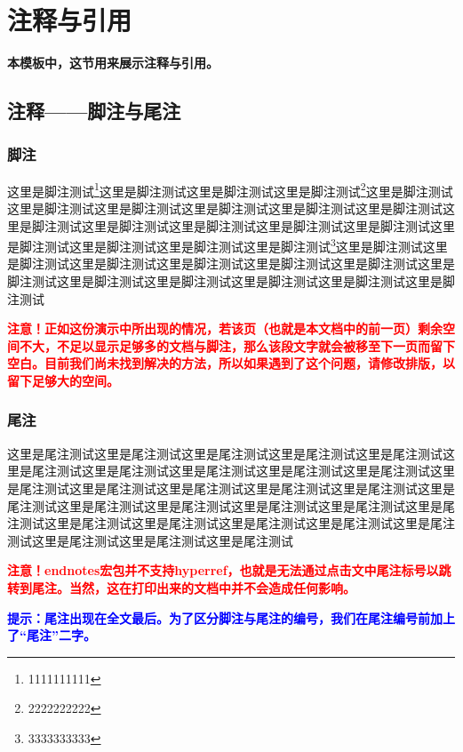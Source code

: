 \section{注释与引用}\textbf{本模板中，这节用来展示注释与引用。}

\subsection{注释——脚注与尾注}
\subsubsection{脚注}
\par 这里是脚注测试\footnote{1111111111}这里是脚注测试这里是脚注测试这里是脚注测试\footnote{2222222222}这里是脚注测试这里是脚注测试这里是脚注测试这里是脚注测试这里是脚注测试这里是脚注测试这里是脚注测试这里是脚注测试这里是脚注测试这里是脚注测试这里是脚注测试这里是脚注测试这里是脚注测试这里是脚注测试这里是脚注测试\footnote{3333333333}这里是脚注测试这里是脚注测试这里是脚注测试这里是脚注测试这里是脚注测试这里是脚注测试这里是脚注测试这里是脚注测试这里是脚注测试这里是脚注测试这里是脚注测试这里是脚注测试

\par \textcolor{red}{\textbf{注意！正如这份演示中所出现的情况，若该页（也就是本文档中的前一页）剩余空间不大，不足以显示足够多的文档与脚注，那么该段文字就会被移至下一页而留下空白。目前我们尚未找到解决的方法，所以如果遇到了这个问题，请修改排版，以留下足够大的空间。}}

\subsubsection{尾注}
\par 这里是尾注测试这里是尾注测试这里是尾注测试这里是尾注测试这里是尾注测试这里是尾注测试这里是尾注测试这里是尾注测试这里是尾注测试这里是尾注测试这里是尾注测试这里是尾注测试这里是尾注测试这里是尾注测试这里是尾注测试这里是尾注测试这里是尾注测试这里是尾注测试这里是尾注测试这里是尾注测试这里是尾注测试这里是尾注测试这里是尾注测试这里是尾注测试这里是尾注测试这里是尾注测试这里是尾注测试这里是尾注测试这里是尾注测试

\par \textcolor{red}{\textbf{注意！endnotes宏包并不支持hyperref，也就是无法通过点击文中尾注标号以跳转到尾注。当然，这在打印出来的文档中并不会造成任何影响。}}
\par \textcolor{blue}{\textbf{提示：尾注出现在全文最后。为了区分脚注与尾注的编号，我们在尾注编号前加上了“尾注”二字。}}

